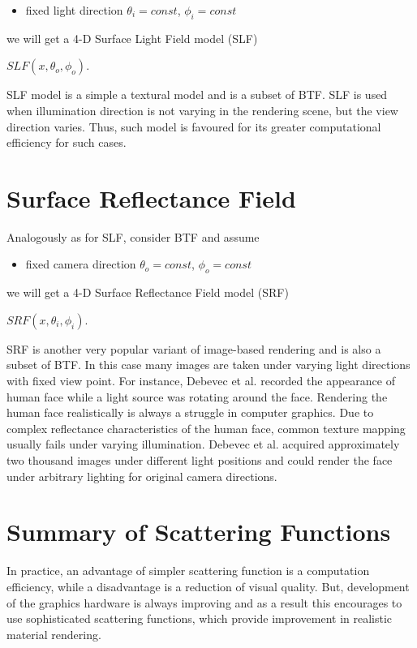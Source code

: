 \begin{itemize}
\item fixed light direction $\theta_{i} = const$, $\phi_{i}=const$
\end{itemize}
we will get a 4-D Surface Light Field model (SLF)
 \begin{center}
$SLF(x,\theta_{o} ,\phi_{o})$.
 \end{center}
 
 SLF model is a simple a textural model and is a subset of BTF. 
 SLF is used when illumination direction is not varying in the rendering scene, but the view direction varies.
 Thus, such model is favoured for its greater computational efficiency for such cases.

\section{Surface Reflectance Field}
\label{section:srf}
Analogously as for SLF, consider BTF and assume

\begin{itemize}
\item fixed camera direction $\theta_{o} = const$, $\phi_{o}=const$
\end{itemize}
we will get a 4-D Surface Reflectance Field model (SRF)
 \begin{center}
$SRF(x,\theta_{i} ,\phi_{i})$.
 \end{center}
 

 SRF is another very popular variant of image-based rendering and is also a subset of BTF. 
 In this case many images are taken under varying light directions with fixed view point\cite{star2004}. 
 For instance, Debevec et al. \cite{debevec} recorded the appearance of human face while a
light source was rotating around the face. Rendering the human face realistically is always a struggle in computer graphics.
Due to complex reflectance characteristics of the human face, common texture mapping usually fails under varying illumination.
 Debevec et al. acquired approximately two thousand images under different light positions and could render the face under arbitrary lighting for original camera directions. 


\section{Summary of Scattering Functions}
\label{section:attrib}
In practice, an advantage of simpler scattering function is a computation efficiency, 
while a disadvantage is a reduction of visual quality. 
But, development of the graphics hardware is always improving and 
as a result this encourages to use sophisticated scattering functions, which provide improvement in realistic material rendering. 
 
